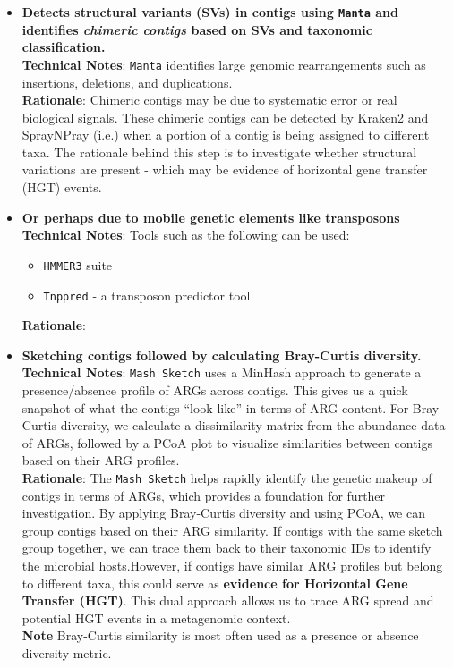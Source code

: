 \documentclass[11pt]{article}
\begin{document}
\begin{itemize}
	\item \textbf{Detects structural variants (SVs) in contigs using \texttt{Manta} and identifies \textit{chimeric contigs} based on SVs and taxonomic classification.}\\
	\textbf{Technical Notes}: \texttt{Manta} identifies large genomic rearrangements such as insertions, deletions, and duplications. \\
	\textbf{Rationale}: Chimeric contigs may be due to systematic error or real biological signals. These chimeric contigs can be detected by Kraken2 and SprayNPray (i.e.) when a portion of a contig is being assigned to different taxa. The rationale behind this step is to investigate whether structural variations are present - which may be evidence of horizontal gene transfer (HGT) events. 
	
	\item \textbf{Or perhaps due to mobile genetic elements like transposons}\\
	\textbf{Technical Notes}: Tools such as the following can be used:
	\begin{itemize}
		\item \texttt{HMMER3} suite
		\item \texttt{Tnppred} - a transposon predictor tool
		
	\end{itemize}
	
	\textbf{Rationale}: 
	
	
	
	\item \textbf{Sketching contigs followed by calculating Bray-Curtis diversity.}\\
	\textbf{Technical Notes}: \texttt{Mash Sketch} uses a MinHash approach to generate a presence/absence profile of ARGs across contigs. This gives us a quick snapshot of what the contigs “look like” in terms of ARG content. For Bray-Curtis diversity, we calculate a dissimilarity matrix from the abundance data of ARGs, followed by a PCoA plot to visualize similarities between contigs based on their ARG profiles. \\
	\textbf{Rationale}: The \texttt{Mash Sketch} helps rapidly identify the genetic makeup of contigs in terms of ARGs, which provides a foundation for further investigation. By applying Bray-Curtis diversity and using PCoA, we can group contigs based on their ARG similarity. If contigs with the same sketch group together, we can trace them back to their taxonomic IDs to identify the microbial hosts.However, if contigs have similar ARG profiles but belong to different taxa, this could serve as \textbf{evidence for \textbf{Horizontal Gene Transfer (HGT)}}. This dual approach allows us to trace ARG spread and potential HGT events in a metagenomic context. \\
	\textbf{Note} Bray-Curtis similarity is most often used as a presence or absence diversity metric.
	


\end{itemize}
\end{document}
